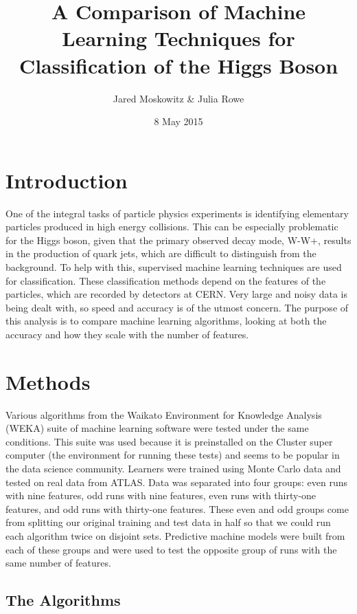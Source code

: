 \documentclass[aps, reprint, amsmath, amssymb]{revtex4-1}
\begin{document}
\title{A Comparison of Machine Learning Techniques for Classification of the Higgs Boson}
\author{Jared Moskowitz \& Julia Rowe}
\date{8 May 2015}

\maketitle

\section{Introduction}
One of the integral tasks of particle physics experiments is identifying elementary particles produced in high energy collisions. This can be especially problematic for the Higgs boson, given that the primary observed decay mode, W-W+, results in the production of quark jets, which are difficult to distinguish from the background. To help with this, supervised machine learning techniques are used for classification. These classification methods depend on the features of the particles, which are recorded by detectors at CERN.  Very large and noisy data is being dealt with, so speed and accuracy is of the utmost concern. The purpose of this analysis is to compare machine learning algorithms, looking at both the accuracy and how they scale with the number of features.  

\section{Methods}
Various algorithms from the Waikato Environment for Knowledge Analysis (WEKA) suite of machine learning software were tested under the same conditions. This suite was used because it is preinstalled on the Cluster super computer (the environment for running these tests) and seems to be popular in the data science community.  Learners were trained using Monte Carlo data and tested on real data from ATLAS.  Data was separated into four groups: even runs with nine features, odd runs with nine features, even runs with thirty-one features, and odd runs with thirty-one features.  These even and odd groups come from splitting our original training and test data in half so that we could run each algorithm twice on disjoint sets. Predictive machine models were built from each of these groups and were used to test the opposite group of runs with the same number of features.  

\subsection{The Algorithms}
\end{document}
